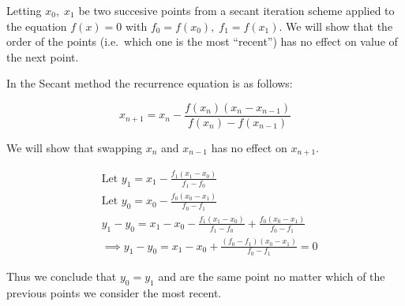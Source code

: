 \documentclass[11pt]{article}
\begin{document}
Letting \(x_0,\;x_1\) be two succesive points from a secant iteration
scheme applied to the equation \(f(x)=0\) with
\(f_0=f(x_0),\;f_1=f(x_1)\). We will show that the order of the points
(i.e.~which one is the most ``recent'') has no effect on value of the
next point.

    In the Secant method the recurrence equation is as follows:

\[ x_{n+1} = x_n - \frac{f(x_n)(x_n-x_{n-1})}{f(x_n)-f(x_{n-1})} \]

    We will show that swapping \(x_n\) and \(x_{n-1}\) has no effect on
\(x_{n+1}\).

\begin{align}
    &\text{Let } y_1 = x_1 - \frac{f_1(x_1-x_0)}{f_1-f_0}\\
    &\text{Let } y_0 = x_0 - \frac{f_0(x_0-x_1)}{f_0-f_1}\\
    &y_1-y_0 = x_1-x_0 - \frac{f_1(x_1-x_0)}{f_1-f_0} + \frac{f_0(x_0-x_1)}{f_0-f_1}\\
    &\implies y_1-y_0 = x_1-x_0 + \frac{(f_0-f_1)(x_0-x_1)}{f_0-f_1} = 0
\end{align}

    Thus we conclude that \(y_0=y_1\) and are the same point no matter which
of the previous points we consider the most recent.


    
    
    
\end{document}
